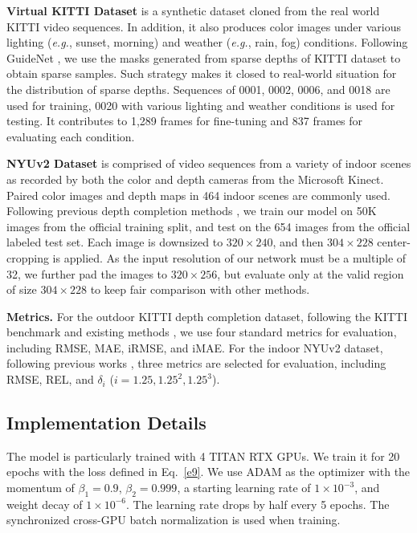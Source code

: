 \documentclass[runningheads]{llncs}
\begin{document}
\noindent \textbf{Virtual KITTI Dataset} \cite{gaidon2016virtual} is a
synthetic dataset cloned from the
real world KITTI video sequences. In addition, it also produces color images under various lighting (\emph{e.g.}, sunset, morning) and weather (\emph{e.g.}, rain, fog) conditions. Following GuideNet \cite{tang2020learning}, we use the masks generated from sparse depths of KITTI dataset to obtain sparse samples. Such strategy makes it closed to real-world situation for the distribution of sparse depths.
Sequences of 0001, 0002, 0006, and 0018 are used for training, 0020 with various lighting and weather conditions is used for testing. It contributes to 1,289 frames for fine-tuning and 837 frames for evaluating each condition.

\noindent \textbf{NYUv2 Dataset} \cite{silberman2012indoor} is comprised of video sequences from a variety of indoor scenes as recorded by both the color and depth cameras from the Microsoft Kinect. Paired color images and depth maps in 464 indoor scenes are commonly used. Following previous depth completion methods \cite{ma2018self,chen2019learning,Qiu_2019_CVPR,park2020nonlocal,tang2020learning}, we train our model on 50K images from the official training split, and test on the 654 images from the official labeled test set. Each image is downsized to $320\times 240$, and then $304\times 228$ center-cropping is applied. As the input resolution of our network must be a multiple of 32, we further pad the images to $320\times 256$, but evaluate only at the valid region of size $304\times 228$ to keep fair comparison with other methods.

\noindent \textbf{Metrics.} For the outdoor KITTI depth completion dataset, following the KITTI benchmark and existing methods \cite{park2020nonlocal,tang2020learning,liu2021fcfr,hu2020PENet}, we use four standard metrics for evaluation, including RMSE, MAE, iRMSE, and iMAE. For the indoor NYUv2 dataset, following previous works \cite{chen2019learning,Qiu_2019_CVPR,park2020nonlocal,tang2020learning,liu2021fcfr}, three metrics are selected for evaluation, including RMSE, REL, and ${{\delta }_{i}}$ ($i=1.25, 1.25^2, 1.25^3$).

\subsection{Implementation Details}
The model is particularly trained with 4 TITAN RTX GPUs. We train it for 20 epochs with the loss defined in Eq.~\ref{e9}. We use ADAM \cite{Kingma2014Adam} as the optimizer with the momentum of $\beta_{1}=0.9$, $\beta_{2}=0.999$, a starting learning rate of $1 \times {10}^{-3}$, and weight decay of $1 \times {10}^{-6}$. The learning rate drops by half every 5 epochs. The synchronized cross-GPU batch normalization \cite{ioffe2015batch,zhang2018context} is used when training.
\end{document}
